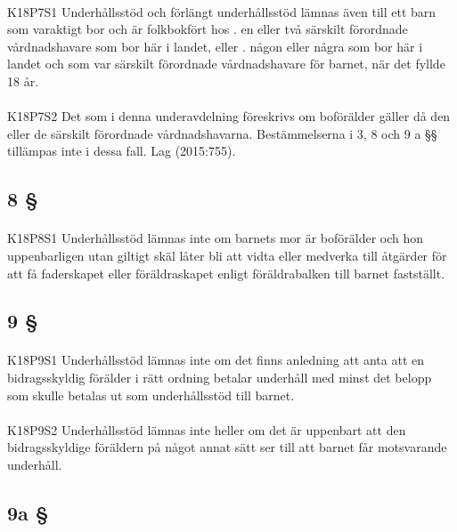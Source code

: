 \documentclass[a4paper,notitlepage,openany,10pt]{book}
\begin{document}
\paragraph*{}
{\tiny K18P7S1}
Underhållsstöd och förlängt underhållsstöd lämnas även till ett barn som varaktigt bor och är folkbokfört hos
. en eller två särskilt förordnade vårdnadshavare som bor här i landet, eller
. någon eller några som bor här i landet och som var särskilt förordnade vårdnadshavare för barnet, när det fyllde 18 år.
\paragraph*{}
{\tiny K18P7S2}
Det som i denna underavdelning föreskrivs om boförälder gäller då den eller de särskilt förordnade vårdnadshavarna.
Bestämmelserna i 3, 8 och 9 a §§ tillämpas inte i dessa fall.
Lag (2015:755).
\subsection*{8 §}
\paragraph*{}
{\tiny K18P8S1}
Underhållsstöd lämnas inte om barnets mor är boförälder och hon uppenbarligen utan giltigt skäl låter bli att vidta eller medverka till åtgärder för att få faderskapet eller föräldraskapet enligt föräldrabalken till barnet fastställt.
\subsection*{9 §}
\paragraph*{}
{\tiny K18P9S1}
Underhållsstöd lämnas inte om det finns anledning att anta att en bidragsskyldig förälder i rätt ordning betalar underhåll med minst det belopp som skulle betalas ut som underhållsstöd till barnet.
\paragraph*{}
{\tiny K18P9S2}
Underhållsstöd lämnas inte heller om det är uppenbart att den bidragsskyldige föräldern på något annat sätt ser till att barnet får motsvarande underhåll.
\subsection*{9a §}
\end{document}
